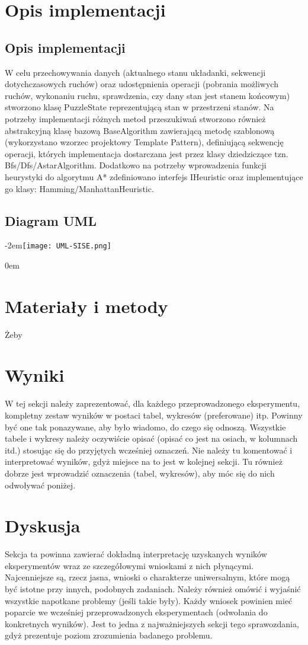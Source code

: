 \documentclass{classrep}
\begin{document}
\section{Opis implementacji}
\subsection{Opis implementacji}
W celu przechowywania danych (aktualnego stanu układanki, sekwencji dotychczasowych ruchów) oraz udostępnienia operacji (pobrania możliwych ruchów, wykonaniu ruchu, sprawdzenia, czy dany stan jest stanem końcowym) stworzono klasę PuzzleState reprezentującą stan w przestrzeni stanów.  
Na potrzeby implementacji różnych metod przeszukiwań stworzono również abstrakcyjną klasę bazową BaseAlgorithm zawierającą metodę szablonową (wykorzystano wzorzec projektowy Template Pattern), definiującą sekwencję operacji, których implementacja dostarczana jest przez klasy dziedziczące tzn. Bfs/Dfs/AstarAlgorithm. Dodatkowo na potrzeby wprowadzenia funkcji heurystyki do algorytmu A* zdefiniowano interfejs IHeuristic oraz implementujące go klasy: Hamming/ManhattanHeuristic.            

\centering
\subsection{Diagram UML}

\leftskip-2em\texttt{[image: UML-SISE.png]}


\leftskip0em\section{Materiały i metody}
Żeby 

\section{Wyniki}
{\color{blue}
W tej sekcji należy zaprezentować, dla każdego przeprowadzonego eksperymentu,
kompletny zestaw wyników w postaci tabel, wykresów (preferowane) itp. Powinny
być one tak ponazywane, aby było wiadomo, do czego się odnoszą. Wszystkie
tabele i wykresy należy oczywiście opisać (opisać co jest na osiach, w
kolumnach itd.) stosując się do przyjętych wcześniej oznaczeń. Nie należy tu
komentować i interpretować wyników, gdyż miejsce na to jest w kolejnej sekcji.
Tu również dobrze jest wprowadzić oznaczenia (tabel, wykresów), aby móc się do
nich odwoływać poniżej.}

\section{Dyskusja}
{\color{blue}
Sekcja ta powinna zawierać dokładną interpretację uzyskanych wyników
eksperymentów wraz ze szczegółowymi wnioskami z nich płynącymi. Najcenniejsze
są, rzecz jasna, wnioski o charakterze uniwersalnym, które mogą być istotne
przy innych, podobnych zadaniach. Należy również omówić i wyjaśnić wszystkie
napotkane problemy (jeśli takie były). Każdy wniosek powinien mieć poparcie we
wcześniej przeprowadzonych eksperymentach (odwołania do konkretnych wyników).
Jest to jedna z najważniejszych sekcji tego sprawozdania, gdyż prezentuje
poziom zrozumienia badanego problemu.}
\end{document}
